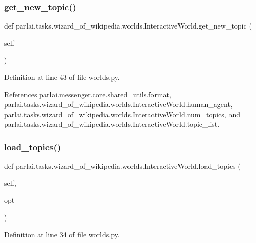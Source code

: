 \subsubsection{\texorpdfstring{get\+\_\+new\+\_\+topic()}{get\_new\_topic()}}
{\footnotesize\ttfamily def parlai.\+tasks.\+wizard\+\_\+of\+\_\+wikipedia.\+worlds.\+Interactive\+World.\+get\+\_\+new\+\_\+topic (\begin{DoxyParamCaption}\item[{}]{self }\end{DoxyParamCaption})}



Definition at line 43 of file worlds.\+py.



References parlai.\+messenger.\+core.\+shared\+\_\+utils.\+format, parlai.\+tasks.\+wizard\+\_\+of\+\_\+wikipedia.\+worlds.\+Interactive\+World.\+human\+\_\+agent, parlai.\+tasks.\+wizard\+\_\+of\+\_\+wikipedia.\+worlds.\+Interactive\+World.\+num\+\_\+topics, and parlai.\+tasks.\+wizard\+\_\+of\+\_\+wikipedia.\+worlds.\+Interactive\+World.\+topic\+\_\+list.

\mbox{\label{classparlai_1_1tasks_1_1wizard__of__wikipedia_1_1worlds_1_1InteractiveWorld_af4efe25e565dbf73a46d1559eb425243}} 
\subsubsection{\texorpdfstring{load\+\_\+topics()}{load\_topics()}}
{\footnotesize\ttfamily def parlai.\+tasks.\+wizard\+\_\+of\+\_\+wikipedia.\+worlds.\+Interactive\+World.\+load\+\_\+topics (\begin{DoxyParamCaption}\item[{}]{self,  }\item[{}]{opt }\end{DoxyParamCaption})}



Definition at line 34 of file worlds.\+py.



